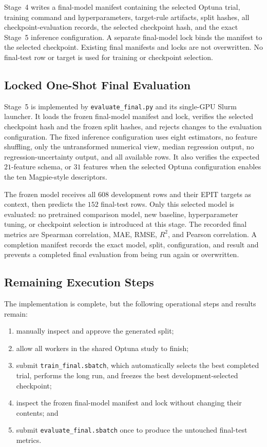 \documentclass{article}
\begin{document}
Stage~4 writes a final-model manifest containing the selected Optuna trial,
training command and hyperparameters, target-rule artifacts, split hashes,
all checkpoint-evaluation records, the selected checkpoint hash, and the exact
Stage~5 inference configuration. A separate final-model lock binds the
manifest to the selected checkpoint. Existing final manifests and locks are
not overwritten. No final-test row or target is used for training or
checkpoint selection.

\subsection{Locked One-Shot Final Evaluation}
\label{sec:epit-final-evaluation}

Stage~5 is implemented by \texttt{evaluate\_final.py} and its single-GPU Slurm
launcher. It loads the frozen final-model manifest and lock, verifies the
selected checkpoint hash and the frozen split hashes, and rejects changes to
the evaluation configuration. The fixed inference configuration uses eight
estimators, no feature shuffling, only the untransformed numerical view,
median regression output, no regression-uncertainty output, and all available
rows. It also verifies the expected \(21\)-feature schema, or \(31\) features
when the selected Optuna configuration enables the ten Magpie-style
descriptors.

The frozen model receives all \(608\) development rows and their EPIT targets
as context, then predicts the \(152\) final-test rows. Only this selected model
is evaluated: no pretrained comparison model, new baseline, hyperparameter
tuning, or checkpoint selection is introduced at this stage. The recorded
final metrics are Spearman correlation, MAE, RMSE, \(R^2\), and Pearson
correlation. A completion manifest records the exact model, split,
configuration, and result and prevents a completed final evaluation from
being run again or overwritten.

\subsection{Remaining Execution Steps}
\label{sec:epit-pipeline-remaining}

The implementation is complete, but the following operational steps and
results remain:

\begin{enumerate}
    \item manually inspect and approve the generated split;
    \item allow all workers in the shared Optuna study to finish;
    \item submit \texttt{train\_final.sbatch}, which automatically selects the
    best completed trial, performs the long run, and freezes the best
    development-selected checkpoint;
    \item inspect the frozen final-model manifest and lock without changing
    their contents; and
    \item submit \texttt{evaluate\_final.sbatch} once to produce the untouched
    final-test metrics.
\end{enumerate}
\end{document}
